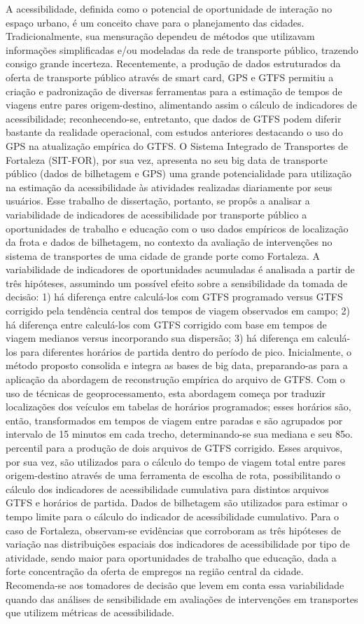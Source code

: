 A acessibilidade, definida como o potencial de oportunidade de interação no espaço urbano, é um conceito chave para o planejamento das cidades. Tradicionalmente, sua mensuração dependeu de métodos que utilizavam informações simplificadas e/ou modeladas da rede de transporte público, trazendo consigo grande incerteza. Recentemente, a produção de dados estruturados da oferta de transporte público através de smart card, GPS e GTFS permitiu a criação e padronização de diversas ferramentas para a estimação de tempos de viagens entre pares origem-destino, alimentando assim o cálculo de indicadores de acessibilidade; reconhecendo-se, entretanto, que dados de GTFS podem diferir bastante da realidade operacional, com estudos anteriores destacando o uso do GPS na atualização empírica do GTFS. O Sistema Integrado de Transportes de Fortaleza (SIT-FOR), por sua vez, apresenta no seu big data de transporte público (dados de bilhetagem e GPS) uma grande potencialidade para utilização na estimação da acessibilidade às atividades realizadas diariamente por seus usuários. Esse trabalho de dissertação, portanto, se propôs a analisar a variabilidade de indicadores de acessibilidade por transporte público a oportunidades de trabalho e educação com o uso dados empíricos de localização da frota e dados de bilhetagem, no contexto da avaliação de intervenções no sistema de transportes de uma cidade de grande porte como Fortaleza. A variabilidade de indicadores de oportunidades acumuladas é analisada a partir de três hipóteses, assumindo um possível efeito sobre a sensibilidade da tomada de decisão: 1) há diferença entre calculá-los com GTFS programado versus GTFS corrigido pela tendência central dos tempos de viagem observados em campo; 2) há diferença entre calculá-los com GTFS corrigido com base em tempos de viagem medianos versus incorporando sua dispersão; 3) há diferença em calculá-los para diferentes horários de partida dentro do período de pico. Inicialmente, o método proposto consolida e integra as bases de big data, preparando-as para a aplicação da abordagem de reconstrução empírica do arquivo de GTFS. Com o uso de técnicas de geoprocessamento, esta abordagem começa por traduzir localizações dos veículos em tabelas de horários programados; esses horários são, então, transformados em tempos de viagem entre paradas e são agrupados por intervalo de 15 minutos em cada trecho, determinando-se sua mediana e seu 85o. percentil para a produção de dois arquivos de GTFS corrigido. Esses arquivos, por sua vez, são utilizados para o cálculo do tempo de viagem total entre pares origem-destino através de uma ferramenta de escolha de rota, possibilitando o cálculo dos indicadores de acessibilidade cumulativa para distintos arquivos GTFS e horários de partida. Dados de bilhetagem são utilizados para estimar o tempo limite para o cálculo do indicador de acessibilidade cumulativo. Para o caso de Fortaleza, observam-se evidências que corroboram as três hipóteses de variação nas distribuições espaciais dos indicadores de acessibilidade por tipo de atividade, sendo maior para oportunidades de trabalho que educação, dada a forte concentração da oferta de empregos na região central da cidade. Recomenda-se aos tomadores de decisão que levem em conta essa variabilidade quando das análises de sensibilidade em avaliações de intervenções em transportes que utilizem métricas de acessibilidade. 


